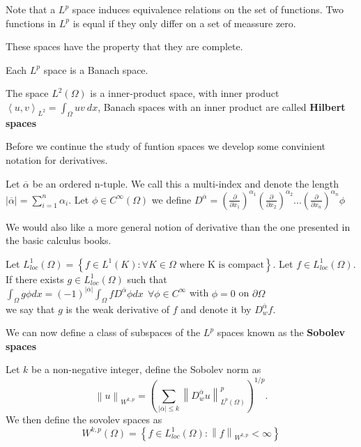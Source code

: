 \documentclass[../Main/main.tex]{subfiles}
\begin{document}
	\begin{remark}
		Note that a $L^p$ space induces equivalence relations on the set of functions. Two functions in $L^p$ is equal if they only differ on a set of meassure zero.
	\end{remark}
	These spaces have the property that they are complete.
	
	\begin{theorem}\label{theorem:Riesz-Fischer}
		Each $L^p$ space is a Banach space.
	\end{theorem}
	\begin{remark}
		The space $L^2(\Omega)$ is a inner-product space, with inner product $\left \langle u,v\right \rangle_{L^2} = \int_{\Omega}uv \ dx$, Banach spaces with an inner product are called \textbf{Hilbert spaces}
	\end{remark}
	
	
	
	
	Before we continue the study of funtion spaces we develop some convinient notation for derivatives.
	
	\begin{definition}
		Let $\overline{\alpha}$ be an ordered n-tuple. We call this a multi-index and denote the length $|\overline{\alpha}| = \sum_{i=1}^n 		\alpha_i$.
		Let $\phi \in C^{\infty}(\Omega)$ we define $D^{\overline{\alpha}} = (\frac{\partial }{\partial x_1})^{\alpha_1}(\frac{\partial }{\partial x_2})^{\alpha_2}...(\frac{\partial }{\partial x_n})^{\alpha_n}\phi$
	\end{definition}
	
	We would also like a more general notion of derivative than the one presented in the basic calculus books.
	\begin{definition}
		Let $L_{loc}^1(\Omega) =\left \{  \right. f\in L^1(K):\forall K \in \Omega \text{  where K is compact}\left.  \right \}$.
		Let $f \in L_{loc}^1(\Omega)$. If there exists $g\in L_{loc}^1 (\Omega)$ such that \\
		$\int_{\Omega} g \phi dx = (-1)^{|\overline{\alpha}|} \int_{\Omega} f D^{\overline{\alpha}} \phi dx \ \ \forall \phi \in C^{\infty}$ with $\phi = 0$ on $\partial \Omega$ \\ we say that $g$ is the weak derivative of $f$ and denote it by $D_w^{\overline{\alpha}}f$.
	\end{definition}
	
	
	We can now define a class of subspaces of the $L^p$ spaces known as the \textbf{Sobolev spaces}
	\begin{definition}
		Let $k$ be a non-negative integer, define the Sobolev norm as 
		\begin{equation*}
			\left \| u \right \|_{W^{k,p}} = (\sum_{|\overline{\alpha}| \leq k} \left \| D_w^{\overline{\alpha}}u \right \|_{L^p(\Omega)}^p)^{1/p}.
		\end{equation*}
		We then define the sovolev spaces as 
		\begin{equation*}
			W^{k,p}(\Omega) = \left \{  \right. f\in L^1_{loc}(\Omega):\left \| f \right \|_{W^{k,p}}<\infty\left.  \right \}
		\end{equation*}
	\end{definition}
	
\end{document}
